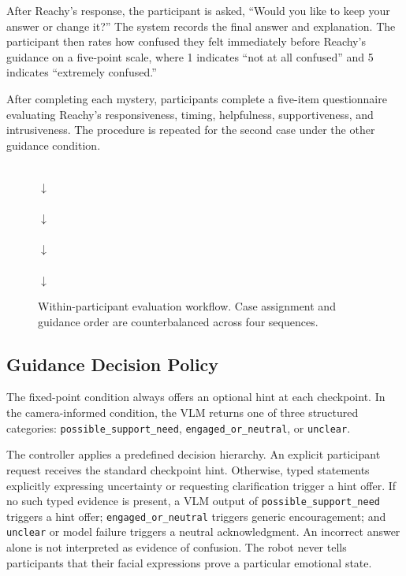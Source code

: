 \documentclass[conference]{IEEEtran}
\begin{document}
After Reachy's response, the participant is asked, ``Would you like to keep your answer or change it?'' The system records the final answer and explanation. The participant then rates how confused they felt immediately before Reachy's guidance on a five-point scale, where 1 indicates ``not at all confused'' and 5 indicates ``extremely confused.''

After completing each mystery, participants complete a five-item questionnaire evaluating Reachy's responsiveness, timing, helpfulness, supportiveness, and intrusiveness. The procedure is repeated for the second case under the other guidance condition.

\begin{figure}[htbp]
\centering
\small
\setlength{\fboxsep}{5pt}
\\[4pt]
$\downarrow$\\[3pt]
\\[4pt]
$\downarrow$\\[3pt]
\\[4pt]
$\downarrow$\\[3pt]
\\[4pt]
$\downarrow$\\[3pt]
\caption{Within-participant evaluation workflow. Case assignment and guidance order are counterbalanced across four sequences.}
\label{fig:workflow}
\end{figure}

\subsection{Guidance Decision Policy}

The fixed-point condition always offers an optional hint at each checkpoint. In the camera-informed condition, the VLM returns one of three structured categories: \texttt{possible\_support\_need}, \texttt{engaged\_or\_neutral}, or \texttt{unclear}.

The controller applies a predefined decision hierarchy. An explicit participant request receives the standard checkpoint hint. Otherwise, typed statements explicitly expressing uncertainty or requesting clarification trigger a hint offer. If no such typed evidence is present, a VLM output of \texttt{possible\_support\_need} triggers a hint offer; \texttt{engaged\_or\_neutral} triggers generic encouragement; and \texttt{unclear} or model failure triggers a neutral acknowledgment. An incorrect answer alone is not interpreted as evidence of confusion. The robot never tells participants that their facial expressions prove a particular emotional state.
\end{document}
